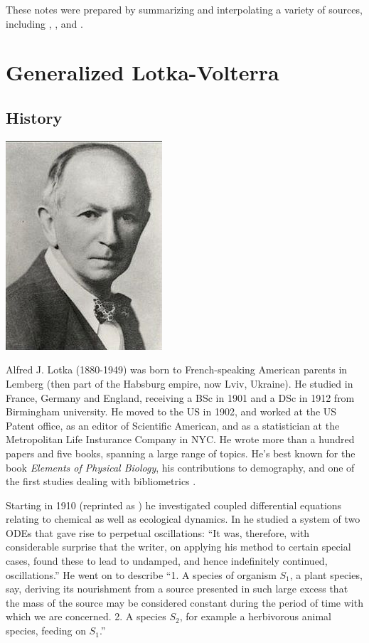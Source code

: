 \documentclass[]{book}
\begin{document}
These notes were prepared by summarizing and interpolating a variety of sources, including \citet{hadeler2017topics}, \citet{hofbauer1998evolutionary}, and \citet{baigent2016lotka}.

\hypertarget{intro}{%
\chapter{Generalized Lotka-Volterra}\label{intro}}

\hypertarget{history}{%
\section{History}\label{history}}

\begin{center}\includegraphics[width=0.25\linewidth]{images/Lotka} \end{center}

Alfred J. Lotka (1880-1949) was born to French-speaking American parents in Lemberg (then part of the Habsburg empire, now Lviv, Ukraine). He studied in France, Germany and England, receiving a BSc in 1901 and a DSc in 1912 from Birmingham university. He moved to the US in 1902, and worked at the US Patent office, as an editor of Scientific American, and as a statistician at the Metropolitan Life Insturance Company in NYC. He wrote more than a hundred papers and five books, spanning a large range of topics. He's best known for the book \emph{Elements of Physical Biology}, his contributions to demography, and one of the first studies dealing with bibliometrics \citep{lotka1926frequency}.

Starting in 1910 (reprinted as \citet{lotka2002contribution}) he investigated coupled differential equations relating to chemical as well as ecological dynamics. In \citet{lotka1920analytical} he studied a system of two ODEs that gave rise to perpetual oscillations: ``It was, therefore, with considerable surprise that the writer, on applying his method to certain special cases, found these to lead to undamped, and hence indefinitely continued, oscillations.'' He went on to describe ``1. A species of organism \(S_1\), a plant species, say, deriving its nourishment from a source presented in such large excess that the mass of the source may be considered constant during the period of time with which we are concerned. 2. A species \(S_2\), for example a herbivorous animal species, feeding on \(S_1\).''
\end{document}
